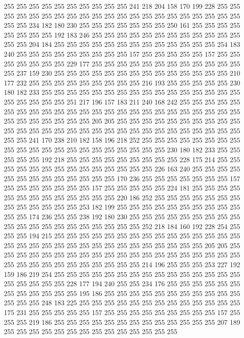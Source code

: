 255 255 255 255 255 255 255 255 255 255 241 218 204 158 170 199 228 255 255 255
255 255 255 255 255 255 255 255 255 255 255 255 255 255 255 255 255 255 255 255
234 182 180 230 255 255 255 255 255 255 255 250 161 255 255 255 255 255 255 255
255 192 183 246 255 255 255 255 255 255 255 255 255 255 255 255 255 255 204 184
255 255 255 255 255 255 255 255 255 255 255 255 255 254 183 240 255 255 255 255
255 255 255 255 255 157 255 255 255 255 255 157 255 255 255 255 255 255 255 229
177 255 255 255 255 255 255 255 255 255 255 255 255 255 237 159 230 255 255 255
255 255 255 255 255 255 255 255 255 255 255 210 177 232 255 255 255 255 255 255
255 255 255 216 193 255 255 255 255 255 230 180 182 233 255 255 255 255 255 255
255 255 255 255 255 255 255 255 255 255 255 255 255 255 255 251 217 196 157 183
211 240 168 242 255 255 255 255 255 255 255 255 255 255 255 255 255 255 255 255
255 255 255 255 255 255 255 255 255 255 255 255 255 255 255 205 205 255 255 255
255 255 255 255 255 255 255 255 255 255 255 255 255 255 255 255 255 255 255 255
255 255 255 255 255 255 255 255 241 170 238 210 182 158 196 218 252 255 255 255
255 255 255 255 255 255 255 255 255 255 255 255 255 255 255 255 255 255 230 180
182 233 255 255 255 255 255 192 218 255 255 255 255 255 255 255 255 255 228 175
214 255 255 255 255 255 255 255 255 255 255 255 255 255 255 226 163 240 255 255
255 255 255 255 255 255 255 255 255 255 255 170 236 255 255 255 255 255 255 255
157 255 255 255 255 255 255 255 157 255 255 255 255 255 224 181 255 255 255 255
255 255 255 255 255 255 255 255 255 220 186 252 255 255 255 255 255 255 255 255
255 255 255 255 255 253 182 199 255 255 255 255 255 255 255 255 255 255 255 255
174 236 255 255 238 192 180 230 255 255 255 255 255 255 255 255 255 255 255 255
255 255 255 255 255 255 255 255 252 218 184 160 192 228 254 255 255 255 194 215
255 255 255 255 255 255 255 255 255 255 255 255 255 255 255 255 255 255 255 255
255 255 255 255 255 255 255 255 255 255 255 205 205 255 255 255 255 255 255 255
255 255 255 255 255 255 255 255 255 255 255 255 255 255 255 255 255 255 255 255
255 255 255 255 214 196 255 255 255 253 227 192 159 186 219 254 255 255 255 255
255 255 255 255 255 255 255 255 255 255 255 255 255 255 255 255 228 177 194 240
255 255 234 176 255 255 255 255 255 255 255 255 255 255 255 255 195 186 255 255
255 255 255 255 255 255 255 255 255 255 255 255 248 183 225 255 255 255 255 255
255 255 255 255 255 255 255 255 175 231 255 255 255 255 255 157 255 255 255 255
255 255 255 255 255 157 255 255 255 219 186 255 255 255 255 255 255 255 255 255
255 255 255 255 207 189 255 255 255 255 255 255 255 255 255 255 255 255 255 255

